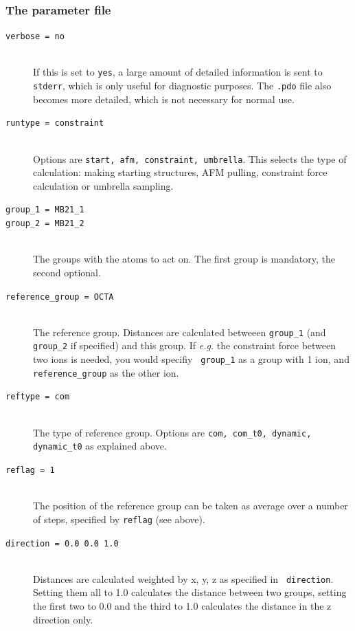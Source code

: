 \subsubsection{The parameter file}

\begin{description}
\item[\tt verbose                  = no]\mbox{}\\
If this is set to {\tt yes}, a large amount of detailed information
is sent to {\tt stderr}, which is only useful for diagnostic
purposes. The {\tt .pdo} file also becomes more detailed, which is not
necessary for normal use.

\item[\tt runtype                  = constraint]\mbox{}\\
Options are {\tt start, afm, constraint, umbrella}. This selects the
type of calculation: making starting structures, AFM pulling,
constraint force calculation or umbrella sampling.

\item[\tt group\_1                  = MB21\_1]
\item[\tt group\_2                  = MB21\_2]\mbox{}\\                 
The groups with the atoms to act on. The first group is mandatory, the
second optional.

\item[\tt reference\_group          = OCTA]\mbox{}\\
The reference group. Distances are calculated betweeen {\tt group\_1}
(and {\tt group\_2} if specified) and this group. If \emph{e.g.} the
constraint force between two ions is needed, you would specifiy {\tt
group\_1} as a group with 1 ion, and {\tt reference\_group} as the other
ion.

\item[\tt reftype                  = com]\mbox{}\\
The type of reference group. Options are {\tt com, com\_t0, dynamic,
dynamic\_t0} as explained above. 

\item[\tt reflag                   = 1]\mbox{}\\
The position of the reference group can be taken as average over a
number of steps, specified by {\tt reflag} (see above).

\item[\tt direction                = 0.0 0.0 1.0]\mbox{}\\
Distances are calculated weighted by x, y, z as specified in {\tt
direction}. Setting them all to 1.0 calculates the distance between
two groups, setting the first two to 0.0 and the third to 1.0
calculates the distance in the z direction only.


\end{description}
